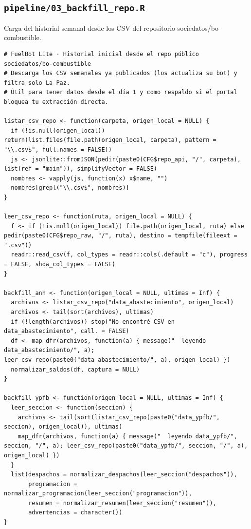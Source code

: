 \subsection{\texttt{pipeline/03\_backfill\_repo.R}}
Carga del historial semanal desde los CSV del repositorio sociedatos/bo-combustible.
\begin{lstlisting}[style=anexoR]
# FuelBot Lite · Historial inicial desde el repo público sociedatos/bo-combustible
# Descarga los CSV semanales ya publicados (los actualiza su bot) y filtra solo La Paz.
# Útil para tener datos desde el día 1 y como respaldo si el portal bloquea tu extracción directa.

listar_csv_repo <- function(carpeta, origen_local = NULL) {
  if (!is.null(origen_local)) return(list.files(file.path(origen_local, carpeta), pattern = "\\.csv$", full.names = FALSE))
  js <- jsonlite::fromJSON(pedir(paste0(CFG$repo_api, "/", carpeta), list(ref = "main")), simplifyVector = FALSE)
  nombres <- vapply(js, function(x) x$name, "")
  nombres[grepl("\\.csv$", nombres)]
}

leer_csv_repo <- function(ruta, origen_local = NULL) {
  f <- if (!is.null(origen_local)) file.path(origen_local, ruta) else pedir(paste0(CFG$repo_raw, "/", ruta), destino = tempfile(fileext = ".csv"))
  readr::read_csv(f, col_types = readr::cols(.default = "c"), progress = FALSE, show_col_types = FALSE)
}

backfill_anh <- function(origen_local = NULL, ultimas = Inf) {
  archivos <- listar_csv_repo("data_abastecimiento", origen_local)
  archivos <- tail(sort(archivos), ultimas)
  if (!length(archivos)) stop("No encontré CSV en data_abastecimiento", call. = FALSE)
  df <- map_dfr(archivos, function(a) { message("  leyendo data_abastecimiento/", a); leer_csv_repo(paste0("data_abastecimiento/", a), origen_local) })
  normalizar_saldos(df, captura = NULL)
}

backfill_ypfb <- function(origen_local = NULL, ultimas = Inf) {
  leer_seccion <- function(seccion) {
    archivos <- tail(sort(listar_csv_repo(paste0("data_ypfb/", seccion), origen_local)), ultimas)
    map_dfr(archivos, function(a) { message("  leyendo data_ypfb/", seccion, "/", a); leer_csv_repo(paste0("data_ypfb/", seccion, "/", a), origen_local) })
  }
  list(despachos = normalizar_despachos(leer_seccion("despachos")),
       programacion = normalizar_programacion(leer_seccion("programacion")),
       resumen = normalizar_resumen(leer_seccion("resumen")),
       advertencias = character())
}
\end{lstlisting}

